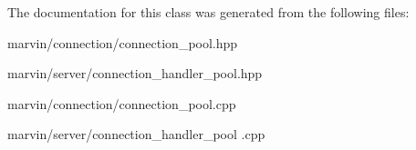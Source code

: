 The documentation for this class was generated from the following files\+:\begin{DoxyCompactItemize}
\item 
marvin/connection/connection\+\_\+pool.\+hpp\item 
marvin/server/connection\+\_\+handler\+\_\+pool.\+hpp\item 
marvin/connection/connection\+\_\+pool.\+cpp\item 
marvin/server/connection\+\_\+handler\+\_\+pool .\+cpp\end{DoxyCompactItemize}
